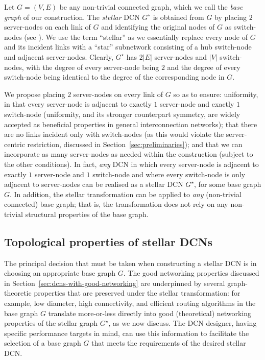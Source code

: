 \documentclass[]{amsart}
\renewcommand\ast{\star}
\begin{document}
Let $G=(V,E)$ be any non-trivial connected graph, which we call the
\emph{base graph} of our construction. The \emph{stellar} DCN
$G^\ast$ is obtained from $G$ by placing $2$ server-nodes on each link
of $G$ and identifying the original nodes of $G$ as switch-nodes (see
). We use the term ``stellar'' as we essentially
replace every node of $G$ and its incident links with a ``star''
subnetwork consisting of a hub switch-node and adjacent
server-nodes. Clearly, $G^\ast$ has $2|E|$ server-nodes and $|V|$
switch-nodes, with the degree of every server-node being $2$ and the
degree of every switch-node being identical to the degree of the
corresponding node in $G$.

We propose placing $2$ server-nodes on every link of $G$ so as to
ensure: uniformity, in that every server-node is adjacent to exactly
$1$ server-node and exactly $1$ switch-node (uniformity, and its stronger counterpart symmetry, are widely accepted as beneficial properties in general interconnection networks); that there are no links
incident only with switch-nodes (as this would violate the server-centric restriction, discussed in
Section~\ref{sec:preliminaries}); and that we can incorporate as many
server-nodes as needed within the construction (subject to the other
conditions). In fact, \emph{any} DCN in which every server-node is adjacent to exactly $1$
server-node and $1$ switch-node and where every switch-node is only
adjacent to server-nodes can be realised as a stellar DCN
$G^\ast$, for some base graph $G$.  In addition, the stellar transformation can be
applied to \emph{any} (non-trivial connected) base graph; that is, the
transformation does not rely on any non-trivial structural properties
of the base graph.

\subsection{Topological properties of stellar DCNs}
\label{sec:properties}

The principal decision that must be taken when constructing a
stellar DCN is in choosing an appropriate base graph $G$.  The
good networking properties discussed in
Section~\ref{sec:dcns-with-good-networking} are underpinned by several
graph-theoretic properties that are preserved under the stellar
transformation: for example, low diameter, high connectivity, and efficient routing
algorithms in the base graph $G$ translate more-or-less directly into
good (theoretical) networking properties of the stellar graph $G^\star$, as we now discuss.  The DCN
designer, having specific performance targets in mind, can use this
information to facilitate the selection of a base graph $G$ that meets
the requirements of the desired stellar DCN.
\end{document}
